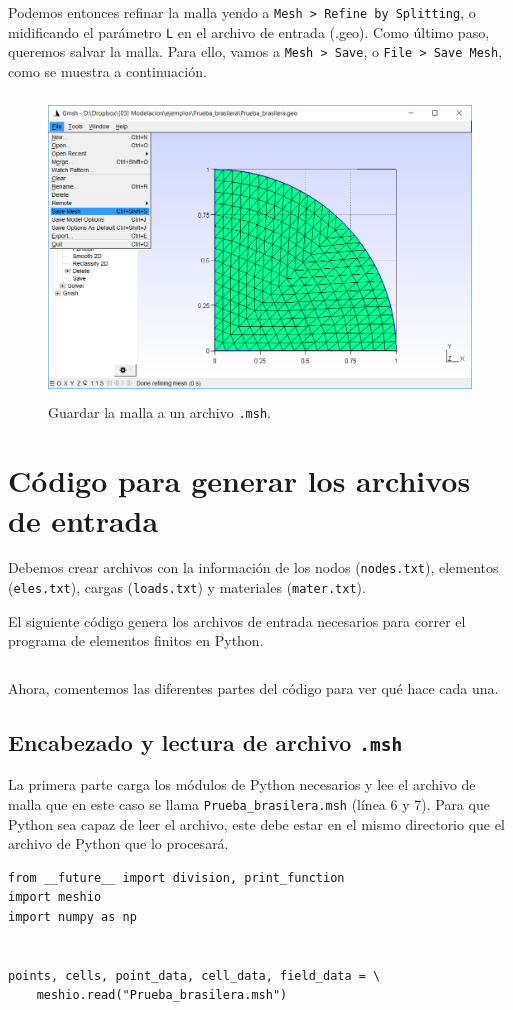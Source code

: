 \documentclass[12pt,letterpaper]{article}
\begin{document}
Podemos entonces refinar la malla yendo a \texttt{Mesh > Refine by Splitting}, o midificando el parámetro \texttt{L} en el archivo de entrada (.geo). Como último paso, queremos salvar la malla. Para ello, vamos a \texttt{Mesh > Save}, o \texttt{File > Save Mesh}, como se muestra a continuación.
\begin{figure}[H]
    \centering
    \includegraphics[height=8cm]{img/Grabar_malla.png} 
    \caption{Guardar la malla a un archivo \texttt{.msh}.}
\end{figure}



\section{Código para generar los archivos de entrada}
Debemos crear archivos con la información de los nodos (\texttt{nodes.txt}), elementos (\texttt{eles.txt}), cargas (\texttt{loads.txt}) y materiales (\texttt{mater.txt}). 

El siguiente código genera los archivos de entrada necesarios para correr el programa de elementos finitos en Python.
\inputminted[mathescape,
               linenos,
               numbersep=5pt,
               gobble=0,
               frame=lines,
               framesep=2mm]{python}{Prueba_brasilera_input.py}


Ahora, comentemos las diferentes partes del código para ver qué hace cada una.

\subsection{Encabezado y lectura de archivo \texttt{.msh}}
La primera parte carga los módulos de Python necesarios y lee el archivo de malla que en este caso se llama \texttt{Prueba\_brasilera.msh} (línea 6 y 7). Para que Python sea capaz de leer el archivo, este debe estar en el mismo directorio que el archivo de Python que lo procesará.
\begin{verbatim}
from __future__ import division, print_function
import meshio
import numpy as np 


points, cells, point_data, cell_data, field_data = \
    meshio.read("Prueba_brasilera.msh")
\end{verbatim}
\end{document}
